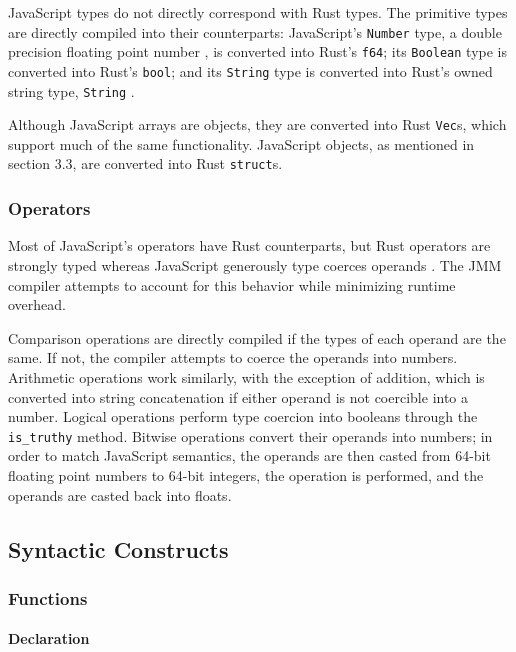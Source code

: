 \documentclass[12pt]{article}
\begin{document}
	JavaScript types do not directly correspond with Rust types. The primitive types are directly compiled into their counterparts: JavaScript's \texttt{Number} type, a double precision floating point number \cite{mozilladata}, is converted into Rust's \texttt{f64}; its \texttt{Boolean} type is converted into Rust's \texttt{bool}; and its \texttt{String} type is converted into Rust's owned string type, \texttt{String} \cite{Klabnik}.
	
	Although JavaScript arrays are objects, they are converted into Rust \texttt{Vec}s, which support much of the same functionality. JavaScript objects, as mentioned in section 3.3, are converted into Rust \texttt{struct}s.
	
	\subsubsection{Operators}
	
	Most of JavaScript's operators have Rust counterparts, but Rust operators are strongly typed \cite{Klabnik} whereas JavaScript generously type coerces operands \cite{mozilladata}. The JMM compiler attempts to account for this behavior while minimizing runtime overhead. 
	
	Comparison operations are directly compiled if the types of each operand are the same. If not, the compiler attempts to coerce the operands into numbers. Arithmetic operations work similarly, with the exception of addition, which is converted into string concatenation if either operand is not coercible into a number. Logical operations perform type coercion into booleans through the \texttt{is\_truthy} method. Bitwise operations convert their operands into numbers; in order to match JavaScript semantics, the operands are then casted from 64-bit floating point numbers to 64-bit integers, the operation is performed, and the operands are casted back into floats.
	
	\subsection{Syntactic Constructs}
	
	\subsubsection{Functions}
	\paragraph{Declaration}
	
\end{document}
